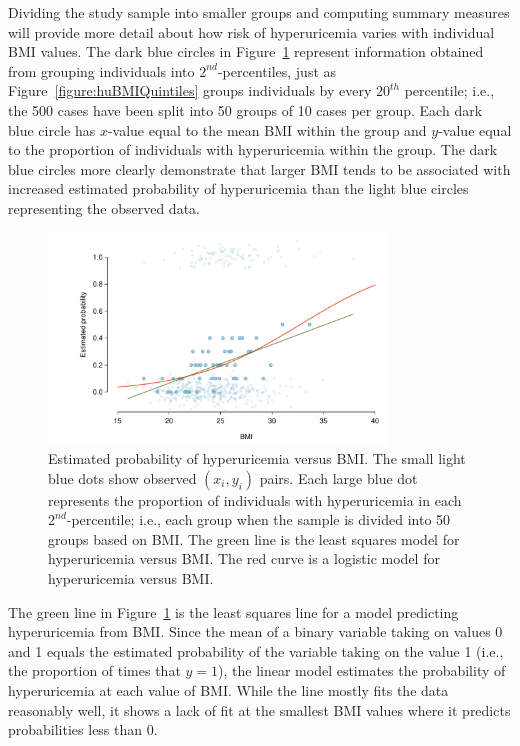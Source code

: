 Dividing the study sample into smaller groups and computing summary measures will provide more detail about how risk of hyperuricemia varies with individual BMI values. The dark blue circles in Figure~\ref{figure:bmiHuProbSecondTile} represent information obtained from grouping individuals into $2^{nd}$-percentiles, just as Figure~\ref{figure:huBMIQuintiles} groups individuals by every $20^{th}$ percentile; i.e., the 500 cases have been split into 50 groups of 10 cases per group. Each dark blue circle has $x$-value equal to the mean BMI within the group and $y$-value equal to the proportion of individuals with hyperuricemia within the group. The dark blue circles more clearly demonstrate that larger BMI tends to be associated with increased estimated probability of hyperuricemia than the light blue circles representing the observed data.

\begin{figure}[h!]
	\centering
	\includegraphics[width=0.80\textwidth]
	{ch_logistic_regression_oi_biostat/figures/bmiHuProbSecondTile/bmiHuProbSecondTile.pdf}
    \caption{Estimated probability of hyperuricemia versus BMI. The small light blue dots show observed $(x_i, y_i)$ pairs. Each large blue dot represents the proportion of individuals with hyperuricemia in each $2^{nd}$-percentile; i.e., each group when the sample is divided into 50 groups based on BMI. The green line is the least squares model for hyperuricemia versus BMI. The red curve is a logistic model for hyperuricemia versus BMI.}
    \label{figure:bmiHuProbSecondTile}
\end{figure}

The green line in Figure~\ref{figure:bmiHuProbSecondTile} is the least squares line for a model predicting hyperuricemia from BMI. Since the mean of a binary variable taking on values 0 and 1 equals the estimated probability of the variable taking on the value 1 (i.e., the proportion of times that $y = 1$), the linear model estimates the probability of hyperuricemia at each value of BMI. While the line mostly fits the data reasonably well, it shows a lack of fit at the smallest BMI values where it predicts probabilities less than 0. 

